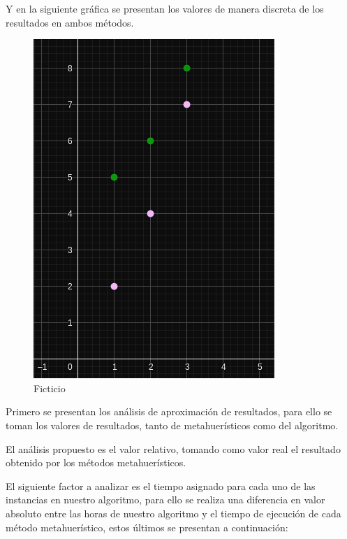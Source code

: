 \documentclass[letterpaper, 10 pt]{article}
\begin{document}
Y en la siguiente gráfica se presentan los valores de manera discreta de los resultados en ambos métodos.

\begin{figure}[h!t]
	\centering
	\includegraphics[scale = 0.2]{ejemplo_grafica.png}
	\caption{Ficticio}
\end{figure}

Primero se presentan los análisis de aproximación de resultados, para ello se toman los valores de resultados, tanto de metahuerísticos como del algoritmo.

El análisis propuesto es el valor relativo, tomando como valor real el resultado obtenido por los métodos metahuerísticos.

El siguiente factor a analizar es el tiempo asignado para cada uno de las instancias en nuestro algoritmo, para ello se realiza una diferencia en valor absoluto entre las horas de nuestro algoritmo y el tiempo de ejecución de cada método metahuerístico, estos  últimos se presentan a continuación:
\end{document}

